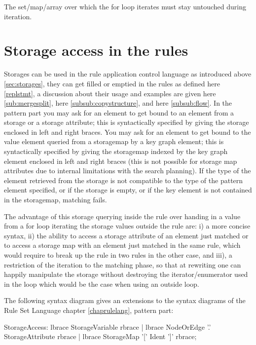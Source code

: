 \begin{warning}
The set/map/array over which the for loop iterates must stay untouched during iteration.
\end{warning}


\section{Storage access in the rules} \label{sub:storageaccess}

Storages can be used in the rule application control language as introduced above \ref{sec:storages}, they can get filled or emptied in the rules as defined here \ref{replstmt}, a discussion about their usage and examples are given here \ref{sub:mergesplit}, here \ref{subsub:copystructure}, and here \ref{subsub:flow}.
In the pattern part you may ask for an element to get bound to an element from a storage or a storage attribute;
this is syntactically specified by giving the storage enclosed in left and right braces.
You may ask for an element to get bound to the value element queried from a storagemap by a key graph element;
this is syntactically specified by giving the storagemap indexed by the key graph element enclosed in left and right braces
(this is not possible for storage map attributes due to internal limitations with the search planning).
If the type of the element retrieved from the storage is not compatible to the type of the pattern element specified,
or if the storage is empty, or if the key element is not contained in the storagemap, matching fails.

The advantage of this storage querying inside the rule over handing in a value from a for loop iterating the storage values outside the rule are: i) a more concise syntax, ii) the ability to access a storage attribute of an element just matched or to access a storage map with an element just matched in the same rule, which would require to break up the rule in two rules in the other case, and iii), a restriction of the iteration to the matching phase, so that at rewriting one can happily manipulate the storage without destroying the iterator/enumerator used in the loop which would be the case when using an outside loop.

The following syntax diagram gives an extensions to the syntax diagrams of the Rule Set Language chapter \ref{chaprulelang}, pattern part:
\begin{rail}
  StorageAccess:
    lbrace StorageVariable rbrace |
    lbrace NodeOrEdge '.' StorageAttribute rbrace |
    lbrace StorageMap '[' Ident ']' rbrace;
\end{rail}

